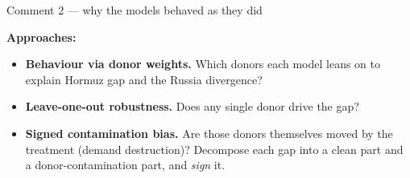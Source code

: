 \documentclass[aspectratio=169,11pt]{beamer}
\newcommand{\hd}[1]{\textbf{#1}}
\begin{document}
\begin{frame}{Comment 2 --- why the models behaved as they did}
  \vspace{0.25em}
  \begin{center}
  \end{center}

  \vspace{0.3em}
  \hd{Approaches:}
  \vspace{0.2em}
  \begin{itemize}\setlength\itemsep{0.35em}
    \item[\textcolor{accent}{\hd{1}}] \hd{Behaviour via donor weights.} Which donors each model leans on to explain Hormuz gap and the Russia divergence?
    \item[\textcolor{accent}{\hd{2}}] \hd{Leave-one-out robustness.} Does any single donor drive the gap?
    \item[\textcolor{accent}{\hd{3}}] \hd{Signed contamination bias.} Are those donors themselves moved by the
      treatment (demand destruction)? Decompose each gap into a clean part and a donor-contamination part, and \emph{sign} it.
  \end{itemize}
\end{frame}
\end{document}
